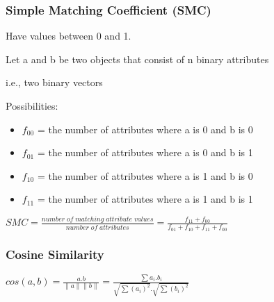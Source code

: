 

\begin{frame}[fragile]\frametitle{Simple Matching Coefficient (SMC)} 

	Have values between 0 and 1.
	
	Let a and b be two objects that consist of n binary attributes 
	
	i.e., two binary vectors
	
	Possibilities:
		\begin{itemize}
			\item $f_{00}$ = the number of attributes where a is 0 and b is 0
			\item $f_{01}$ = the number of attributes where a is 0 and b is 1
			\item $f_{10}$ = the number of attributes where a is 1 and b is 0
			\item $f_{11}$ = the number of attributes where a is 1 and b is 1
\end{itemize}


$
		SMC = \frac{number\;of\;matching\;attribute\;values}{number\;of\;attributes} = 
		\frac{f_{11} + f_{00}}{f_{01} + f_{10} + f_{11} + f_{00}}
$
\end{frame}

%
%

\begin{frame}[fragile]\frametitle{Cosine Similarity} 

$
		cos(a,b) = \frac{a . b}{\|a\| \|b\|} = \frac{\sum a_{i}. b_{i}}{\sqrt{\sum(a_{i})^2} .  \sqrt{\sum(b_{i})^{2}}}
$
\end{frame}

